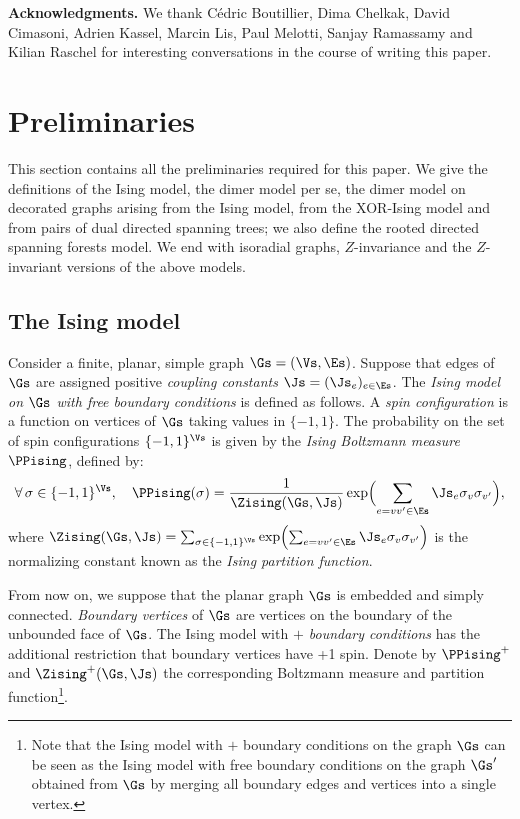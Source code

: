 \documentclass[a4paper,twoside,11pt]{article}
\begin{document}
\textbf{Acknowledgments.} We thank C\'edric Boutillier, Dima Chelkak, David Cimasoni, Adrien Kassel, Marcin Lis, Paul Melotti, 
Sanjay Ramassamy and Kilian Raschel for interesting conversations
in the course of writing this paper.


\section{Preliminaries}\label{sec:prelim}

This section contains all the preliminaries required for this paper. We give the definitions of the Ising model, the dimer model per se, 
the dimer model on decorated graphs arising from the Ising model, from the XOR-Ising model and from pairs of dual directed spanning 
trees; we also define the rooted directed spanning forests model. We end with isoradial graphs, $Z$-invariance and the $Z$-invariant 
versions of the above models.

\subsection{The Ising model}\label{sec:defIsing}

Consider a finite, planar, simple graph $\Gs=(\Vs,\Es)$. Suppose that edges of $\Gs$ are assigned positive 
\emph{coupling constants} $\Js=(\Js_e)_{e\in\Es}$.
The \emph{Ising model on $\Gs$ with free boundary conditions} is defined as follows. A \emph{spin configuration} is a function on
vertices of $\Gs$ taking values in $\{-1,1\}$. The probability on the set of spin configurations $\{-1,1\}^{\Vs}$ is given by
the \emph{Ising Boltzmann measure} $\PPising$, defined by:
\[
\forall\,\sigma\in\{-1,1\}^\Vs,\quad \PPising(\sigma)=\frac{1}{\Zising(\Gs,\Js)}
\exp\Bigl(\sum_{e=vv'\in\Es}\Js_e \sigma_v\sigma_{v'}\Bigr),
\]
where $\Zising(\Gs,\Js)=\sum_{\sigma\in\{-1,1\}^\Vs}\exp\Bigl(\sum_{e=vv'\in\Es}\Js_e \sigma_v\sigma_{v'}\Bigr)$ is the normalizing
constant known as the \emph{Ising partition function}.

From now on, we suppose that the planar graph $\Gs$ is embedded and simply connected. \emph{Boundary vertices} of $\Gs$ are vertices on the boundary of 
the unbounded face of $\Gs$. The Ising model with \emph{$+$ boundary conditions} has the additional restriction that boundary vertices
have +1 spin. Denote by $\PPising^+$
and $\Zising^+(\Gs,\Js)$ the corresponding Boltzmann measure and partition function\footnote{Note that the 
Ising model with $+$ boundary conditions on the graph $\Gs$ 
can be seen as the Ising model with free boundary conditions on the graph $\Gs'$ obtained from $\Gs$ by merging all 
boundary edges and vertices into a single vertex.}.
\end{document}
